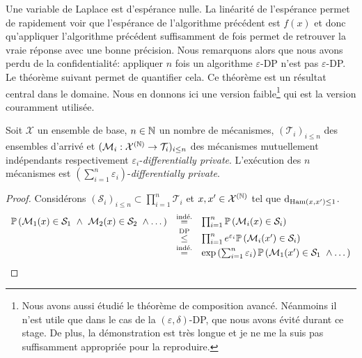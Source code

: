 Une variable de {\sc Laplace} est d’espérance nulle. La linéarité de l'espérance permet de rapidement voir que l'espérance de l’algorithme précédent est \(f(x)\) et donc qu'appliquer l'algorithme précédent suffisamment de fois permet de retrouver la vraie réponse avec une bonne précision. Nous remarquons alors que nous avons perdu de la confidentialité: appliquer \(n\) fois un algorithme \(\varepsilon\)-DP n'est pas \(\varepsilon\)-DP. Le théorème suivant permet de quantifier cela. Ce théorème est un résultat central dans le domaine. Nous en donnons ici une version faible\footnote{Nous avons aussi étudié le théorème de composition avancé. Néanmoins il n'est utile que dans le cas de la \((\varepsilon, \delta)\)-DP, que nous avons évité durant ce stage. De plus, la démonstration est très longue et je ne me la suis pas suffisamment appropriée pour la reproduire.} qui est la version couramment utilisée.\\

\begin{theorem}
    \label{compo}
    Soit \(\mathcal X\) un ensemble de base, \(n \in \mathbb{N}\) un nombre de mécanismes, \((\mathcal T_i)_{i \leq n}\) des ensembles d'arrivé et \((\mathcal M_i : \mathcal X^{(\mathbb{N})} \to \mathcal T_i)_{i \leq n}\) des mécanismes mutuellement indépendants respectivement \(\varepsilon_i\)-\textit{differentially private}. L’exécution des \(n\) mécanismes est \(\left(\sum\limits_{i = 1}^n \varepsilon_i\right)\)-\textit{differentially private}.
\end{theorem} 

\begin{proof}
    Considérons \((\mathcal S_i)_{i \leq n} \subset \prod_{i = 1}^n \mathcal T_i\) et \(x, x' \in \mathcal X^{(\mathbb{N})}\) tel que \(\mathrm{d}_{\text{Ham}(x,x') \leq 1}\).\\
 
    \[
        \begin{array}[]{rcl}
            \mathbb P\left(\mathcal M_1(x) \in \mathcal S_1 \ \wedge \ \mathcal M_2(x) \in \mathcal S_2 \ \wedge \dots \right) & \overset{\text{indé.}}{=} & \prod_{i = 1}^n \mathbb P\left(\mathcal M_i(x) \in \mathcal S_i \right)\\
            & \overset{\text{DP}}{\leq} & \prod_{i = 1}^n e^{\varepsilon_i}\mathbb P\left(\mathcal M_i(x') \in \mathcal S_i \right)\\
            & \overset{\text{indé.}}{=} & \exp\left( \sum_{i = 1}^n \varepsilon_i \right)\mathbb P\left(\mathcal M_1(x') \in \mathcal S_1 \ \wedge \dots \right)
        \end{array}
    \]
\end{proof}

